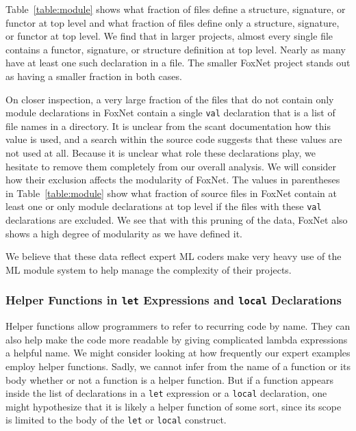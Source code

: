 \documentclass[12pt,abstracton]{scrartcl}
\begin{document}
Table~\ref{table:module} shows what fraction of files define a structure, signature, or functor at top level
and what fraction of files define only a structure, signature, or functor at top level.
We find that in larger projects, almost every single file contains a functor, signature, or structure
definition at top level. Nearly as many have at least one such declaration in a file.
The smaller FoxNet project stands out as having a smaller fraction in both cases.

On closer inspection, a very large fraction of the files that do not contain only module declarations
in FoxNet contain a single \texttt{val} declaration that is a list of file names in a directory. It is unclear
from the scant documentation how this value is used, and a search within the source code
suggests that these values are not used at all.
Because it is unclear what role these declarations play, we hesitate to remove
them completely from our overall analysis. We will consider
how their exclusion affects the modularity of FoxNet.
The values in parentheses in Table~\ref{table:module} show what
fraction of source files in FoxNet contain at least one or only module declarations at top level
if the files with these \texttt{val} declarations are excluded. We see that
with this pruning of the data, FoxNet also shows a high degree of modularity as we have defined it.

We believe that these data reflect expert ML coders
make very heavy use of the ML module system to help manage the complexity of their projects.
\subsubsection{Helper Functions in \texttt{let} Expressions and \texttt{local} Declarations}\label{subsubsec:let}
Helper functions allow programmers to refer to recurring code by name.
They can also help make the code more readable by giving complicated
lambda expressions a helpful name. We might consider looking at
how frequently our expert examples employ helper functions. Sadly,
we cannot infer from the name of a function or its body whether or not
a function is a helper function. But if a function appears inside
the list of declarations in a \texttt{let} expression or a \texttt{local}
declaration, one might hypothesize that it is likely a helper function
of some sort, since its scope is limited to the body of the \texttt{let}
or \texttt{local} construct.
\end{document}
